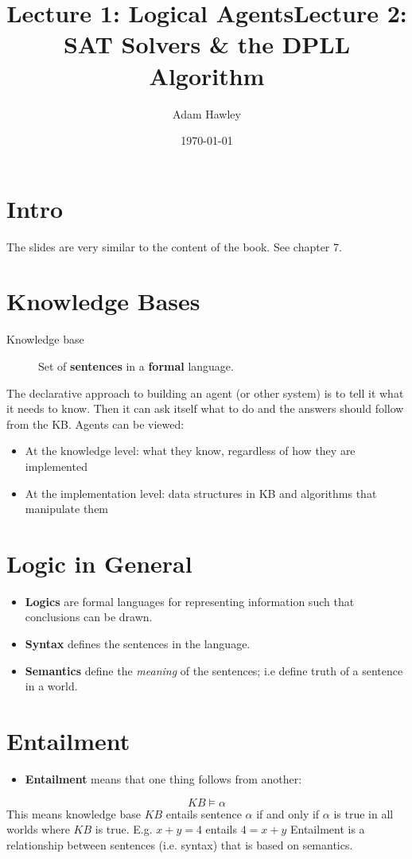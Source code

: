 \documentclass[11pt]{article}
\author{Adam Hawley}
\date{\today}
\title{Lecture 1: Logical Agents}
\title{Lecture 2: SAT Solvers \& the DPLL Algorithm}
\begin{document}
\maketitle
\tableofcontents


\section{Intro}
\label{sec:org8ac8ab8}
The slides are very similar to the content of the book.
See chapter 7.

\section{Knowledge Bases}
\label{sec:org21b6bcd}
\begin{description}
\item[{Knowledge base}] Set of \textbf{sentences} in a \textbf{formal} language.
\end{description}
The declarative approach to building an agent (or other system) is to tell it what it needs to know.
Then it can ask itself what to do and the answers should follow from the KB.
Agents can be viewed:
\begin{itemize}
\item At the knowledge level: what they know, regardless of how they are implemented
\item At the implementation level: data structures in KB and algorithms that manipulate them
\end{itemize}

\section{Logic in General}
\label{sec:org687c359}
\begin{itemize}
\item \textbf{Logics} are formal languages for representing information such that conclusions can be drawn.
\item \textbf{Syntax} defines the sentences in the language.
\item \textbf{Semantics} define the \emph{meaning} of the sentences; i.e define truth of a sentence in a world.
\end{itemize}

\section{Entailment}
\label{sec:org34b83f8}
\begin{itemize}
\item \textbf{Entailment} means that one thing follows from another:
\end{itemize}
\begin{equation}
KB \models \alpha
\end{equation}
This means knowledge base \(KB\) entails sentence \(\alpha\) if and only if \(\alpha\) is true in all worlds where \(KB\) is true.
E.g. \(x + y = 4\) entails \(4 = x + y\)
Entailment is a relationship between sentences (i.e. syntax) that is based on semantics.
\end{document}

